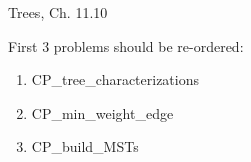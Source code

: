 \documentclass[handout]{mcs}
\begin{document}

\begin{staffnotes}
Trees, Ch. 11.10 
\end{staffnotes}


\begin{staffnotes}

First 3 problems should be re-ordered:
\begin{enumerate}

\item CP_tree_characterizations

\item CP_min_weight_edge

\item CP_build_MSTs

\end{enumerate}

\end{staffnotes}







\end{document}
